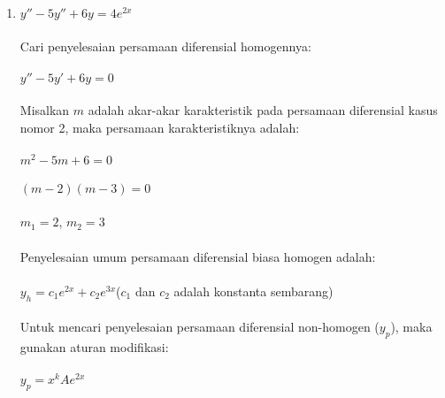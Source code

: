 \begin{enumerate}[1.]
	\item \begin{math} y'' - 5y'' + 6y = 4e^{2x} \end{math} \\ \\
	Cari penyelesaian persamaan diferensial homogennya: \\ \\
	\begin{math} y'' - 5y' + 6y = 0 \end{math} \\ \\
	Misalkan \begin{math} m \end{math} adalah akar-akar karakteristik pada persamaan diferensial kasus nomor 2, maka persamaan karakteristiknya adalah: \\ \\
	\begin{math} m^{2} - 5m + 6 = 0 \end{math} \\ \\
	\begin{math} (m - 2) (m - 3) = 0 \end{math} \\ \\
	\begin{math} m_1 = 2 \end{math}, \begin{math} m_2 = 3 \end{math} \\ \\
	Penyelesaian umum persamaan diferensial biasa homogen adalah: \\ \\
	\begin{math} y_h = c_1 e^{2x} + c_2 e^{3x} \end{math}(\begin{math} c_1 \end{math} dan \begin{math} c_2 \end{math} adalah konstanta sembarang) \\ \\
	Untuk mencari penyelesaian persamaan diferensial non-homogen (\begin{math} y_p \end{math}), maka gunakan aturan modifikasi: \\ \\
	\begin{math} y_p = x^{k} Ae^{2x} \end{math} \\ \\

\end{enumerate}
